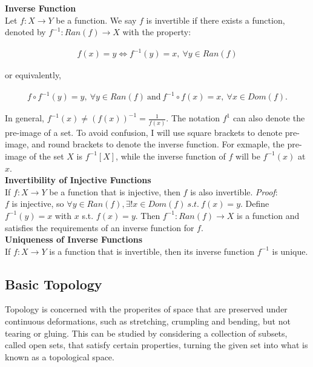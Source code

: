 \documentclass{article}
\numberwithin{theorem}{subsection}
\numberwithin{theorem}{subsubsection}
\numberwithin{lemma}{subsection}
\numberwithin{lemma}{subsubsection}
\theoremstyle{definition}
\numberwithin{definition}{subsection}
\numberwithin{definition}{subsubsection}
\begin{document}
\noindent \textbf{Inverse Function} \\
\indent Let $f:X \rightarrow Y$ be a function. We say $f$ is invertible if there exists a function, denoted by $f^{-1}:Ran(f) \rightarrow X$ with the property:

\begin{gather*}
    f(x) = y \iff f^{-1}(y) = x,\ \forall y \in Ran(f)
\end{gather*}

\noindent or equivalently,

\begin{gather*}
    f \circ f^{-1}(y) = y,\ \forall y \in Ran(f)\ \text{and}\ f^{-1} \circ f(x) = x,\ \forall x \in Dom(f).
\end{gather*}

\indent In general, $f^{-1}(x) \neq (f(x))^{-1} = \frac{1}{f(x)}$. The notation $f^{1}$ can also denote the pre-image of a set. To avoid confusion, I will use square brackets to denote pre-image, and round brackets to denote the inverse function. For exmaple, the pre-image of the set $X$ is $f^{-1}[X]$, while the inverse function of $f$ will be $f^{-1}(x)$ at $x$. \\

\noindent \textbf{Invertibility of Injective Functions} \\
\indent If $f:X \rightarrow Y$ be a function that is injective, then $f$ is also invertible. \textit{Proof}:\\
$f$ is injective, so $\forall y \in Ran(f), \exists!x \in Dom(f)\ s.t.\ f(x) = y$. Define $f^{-1}(y) = x$ with $x$ s.t. $f(x) = y$. Then $f^{-1}: Ran(f) \rightarrow X$ is a function and satisfies the requirements of an inverse function for $f$. \\

\noindent \textbf{Uniqueness of Inverse Functions} \\
\indent If $f: X \rightarrow Y$ is a function that is invertible, then its inverse function $f^{-1}$ is unique.

\subsection{Basic Topology}
Topology is concerned with the properites of space that are preserved under continuous deformations, such as stretching, crumpling and bending, but not tearing or gluing. This can be studied by considering a collection of subsets, called open sets, that satisfy certain properties, turning the given set into what is known as a topological space. \\
\end{document}
